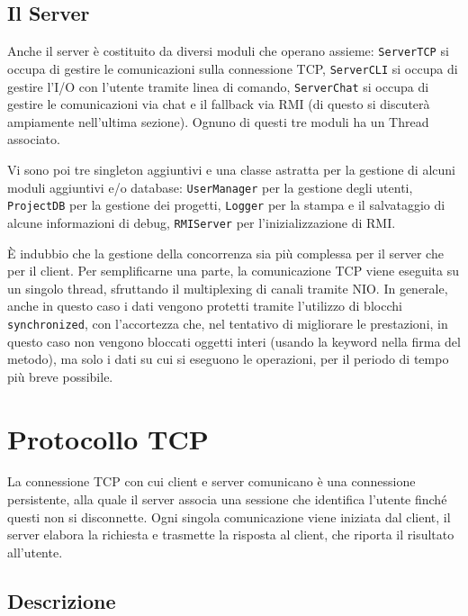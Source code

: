 \documentclass[a4paper,11pt] {article}
\begin{document}
\subsection*{Il Server}

Anche il server è costituito da diversi moduli che operano assieme: \texttt{ServerTCP} si occupa di gestire le comunicazioni sulla connessione TCP, \texttt{ServerCLI} si occupa di gestire l'I/O con l'utente tramite linea di comando, \texttt{ServerChat} si occupa di gestire le comunicazioni via chat e il fallback via RMI (di questo si discuterà ampiamente nell'ultima sezione). Ognuno di questi tre moduli ha un Thread associato.

Vi sono poi tre singleton aggiuntivi e una classe astratta per la gestione di alcuni moduli aggiuntivi e/o database: \texttt{UserManager} per la gestione degli utenti, \texttt{ProjectDB} per la gestione dei progetti, \texttt{Logger} per la stampa e il salvataggio di alcune informazioni di debug, \texttt{RMIServer} per l'inizializzazione di RMI.

È indubbio che la gestione della concorrenza sia più complessa per il server che per il client. Per semplificarne una parte, la comunicazione TCP viene eseguita su un singolo thread, sfruttando il multiplexing di canali tramite NIO. In generale, anche in questo caso i dati vengono protetti tramite l'utilizzo di blocchi \texttt{synchronized}, con l'accortezza che, nel tentativo di migliorare le prestazioni, in questo caso non vengono bloccati oggetti interi (usando la keyword nella firma del metodo), ma solo i dati su cui si eseguono le operazioni, per il periodo di tempo più breve possibile.

\section*{Protocollo TCP}

La connessione TCP con cui client e server comunicano è una connessione persistente, alla quale il server associa una sessione che identifica l'utente finché questi non si disconnette. Ogni singola comunicazione viene iniziata dal client, il server elabora la richiesta e trasmette la risposta al client, che riporta il risultato all'utente.

\subsection*{Descrizione}
\end{document}
